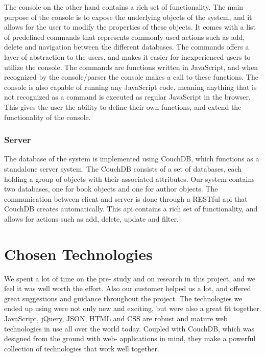 The console on the other hand contains a rich set of functionality. The main purpose of the console is to expose the underlying objects of the system, and it allows for the user to modify the properties of these objects. It comes with a list of predefined commands that represents commonly used actions such as add, delete and navigation between the different databases. The commands offers a layer of abstraction to the users, and makes it easier for inexperienced users to utilize the console. The commands are functions written in JavaScript, and when recognized by the console/parser the console makes a call to these functions. The console is also capable of running any JavaScript code, meaning anything that is not recognized as a command is executed as regular JavaScript in the browser. This gives the user the ability to define their own functions, and extend the functionality of the console.

\subsubsection{Server}
The database of the system is implemented using CouchDB, which functions as a standalone server system. The CouchDB consists of a set of databases, each holding a group of objects with their associated attributes. Our system contains two databases, one for book objects and one for author objects. The communication between client and server is done through a RESTful api that CouchDB creates automatically. This api contains a rich set of functionality, and allows for actions such as add, delete, update and filter. 

\section{Chosen Technologies}
We spent a lot of time on the pre- study and on research in this project, and we feel it was well worth the effort. Also our customer helped us a lot, and offered great suggestions and guidance throughout the project. The technologies we ended up using were not only new and exciting, but were also a great fit together. JavaScript, jQuery, JSON, HTML and CSS are robust and mature web technologies in use all over the world today. Coupled with CouchDB, which was designed from the ground with web- applications in mind, they make a powerful collection of technologies that work well together.

